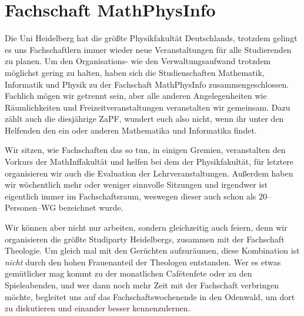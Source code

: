 
\section{Fachschaft MathPhysInfo}

Die Uni Heidelberg hat die größte Physikfakultät Deutschlands, trotzdem gelingt es uns Fachschaftlern immer wieder neue Veranstaltungen für alle Studierenden zu planen. Um den Organisations- wie den Verwaltungsaufwand trotzdem möglichst gering zu halten, haben sich die Studienschaften Mathematik, Informatik und Physik zu der Fachschaft MathPhysInfo zusammengeschlossen. Fachlich mögen wir getrennt sein, aber alle anderen Angelegenheiten wie Räumlichkeiten und Freizeitveranstaltungen veranstalten wir gemeinsam. Dazu zählt auch die diesjährige ZaPF, wundert euch also nicht, wenn ihr unter den Helfenden den ein oder anderen Mathematika und Informatika findet.

Wir sitzen, wie Fachschaften das so tun, in einigen Gremien, veranstalten den Vorkurs der MathInffakultät und helfen bei dem der Physikfakultät, für letztere organisieren wir auch die Evaluation der Lehrveranstaltungen. Außerdem haben wir wöchentlich mehr oder weniger sinnvolle Sitzungen und irgendwer ist eigentlich immer im Fachschaftsraum, weswegen dieser auch schon als 20--Personen--WG bezeichnet wurde.

Wir können aber nicht nur arbeiten, sondern gleichzeitig auch feiern, denn wir organisieren die größte Studiparty Heidelbergs, zusammen mit der Fachschaft Theologie. Um gleich mal mit den Gerüchten aufzuräumen, diese Kombination ist \textit{nicht} durch den hohen Frauenanteil der Theologen entstanden.
Wer es etwas gemütlicher mag kommt zu der monatlichen Cafétenfete oder zu den Spieleabenden, und wer dann noch mehr Zeit mit der Fachschaft verbringen möchte, begleitet uns auf das Fachschaftswochenende in den Odenwald, um dort zu diskutieren und einander besser kennenzulernen.

